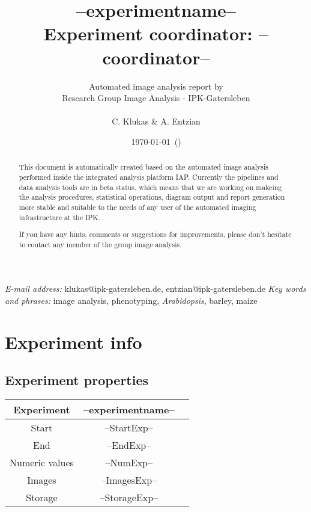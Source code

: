 \documentclass[%
  paper=a4, %
  pagesize, %
  DIV=calc, %
  headings=small,%
  english,   %
  oneside
]{scrartcl}  %
\providecommand{\tabularnewline}{\\}
\begin{document}
\title{--experimentname-- \tabularnewline \vspace{10 mm} \large{Experiment coordinator: --coordinator--}}

\author{Automated image analysis report by\tabularnewline Research
Group Image Analysis - IPK-Gatersleben\tabularnewline \tabularnewline C. Klukas
\& A. Entzian}

\date{\today ~(\currenttime )}

\maketitle
\thispagestyle{empty}  
\begin{abstract}
This document is automatically created based on the automated image analysis performed 
inside the integrated analysis platform IAP. Currently the pipelines and data analysis tools are in beta status, 
which means that we are working on makeing the analysis procedures, statistical operations, diagram output and report
generation more stable and suitable to the needs of any user of the automated imaging infrastructure at the IPK.

If you have any hints, comments or suggestions for improvements, please don't hesitate to contact any member
of the group image analysis.
\end{abstract}
\vfill
\small{\textit{E-mail address:} klukas@ipk-gatersleben.de, entzian@ipk-gatersleben.de}
\newline 
\small{\textit{Key words and phrases:} image analysis, phenotyping, \textit{Arabidopsis}, barley, maize }
 

\clearpage
\tableofcontents

\clearpage
\pagestyle{headings}
\section{Experiment info} 
\subsection{Experiment properties}


\begin{tabular}{|c|c|c|}
\hline 
Experiment & --experimentname--\tabularnewline
\hline 
\hline 
Start & --StartExp--\tabularnewline
\hline 
End & --EndExp--\tabularnewline
\hline 
Numeric values & --NumExp-- \tabularnewline
\hline 
Images & --ImagesExp-- \tabularnewline
\hline 
Storage & --StorageExp-- \tabularnewline
\hline 
\end{tabular}
\end{document}
